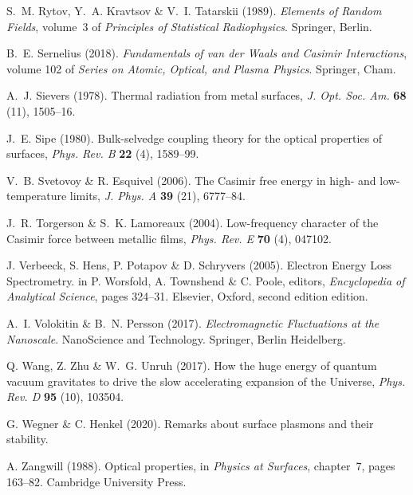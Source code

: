 \documentclass[11pt, oneside]{article}   	%
\begin{document}
\begin{thebibliography}{58}
S.~M. Rytov, Y.~A. Kravtsov \& V.~I. Tatarskii (1989).
\newblock \emph{Elements of Random Fields}, volume~3 of \emph{Principles of
  Statistical Radiophysics}.
\newblock Springer, Berlin.

B.~E. Sernelius (2018).
\newblock \emph{Fundamentals of van der Waals and Casimir Interactions}, volume
  102 of \emph{Series on Atomic, Optical, and Plasma Physics}.
\newblock Springer, Cham.

A.~J. Sievers (1978).
\newblock Thermal radiation from metal surfaces, \emph{J. Opt. Soc. Am.} {\bf
  68} (11), 1505--16.

J.~E. Sipe (1980).
\newblock Bulk-selvedge coupling theory for the optical properties of surfaces,
  \emph{Phys. Rev. B} {\bf 22} (4), 1589--99.

V.~B. Svetovoy \& R. Esquivel (2006).
\newblock The Casimir free energy in high- and low-temperature limits, \emph{J.
  Phys. A} {\bf 39} (21), 6777--84.

J.~R. Torgerson \& S.~K. Lamoreaux (2004).
\newblock Low-frequency character of the Casimir force between metallic films,
  \emph{Phys. Rev. E} {\bf 70} (4), 047102.

J. Verbeeck, S. Hens, P. Potapov \& D. Schryvers (2005).
\newblock Electron Energy Loss Spectrometry.
\newblock in P. Worsfold, A. Townshend \& C. Poole, editors, \emph{Encyclopedia
  of Analytical Science}, pages 324--31. Elsevier, Oxford, second edition
  edition.

A.~I. Volokitin \& B.~N. Persson (2017).
\newblock \emph{Electromagnetic Fluctuations at the Nanoscale}.
\newblock NanoScience and Technology. Springer, Berlin Heidelberg.

Q. Wang, Z. Zhu \& W.~G. Unruh (2017).
\newblock How the huge energy of quantum vacuum gravitates to drive the slow
  accelerating expansion of the Universe, \emph{Phys. Rev. D} {\bf 95} (10),
  103504.

G. Wegner \& C. Henkel (2020).
\newblock Remarks about surface plasmons and their stability.

A. Zangwill (1988).
\newblock Optical properties, in \emph{Physics at Surfaces}, chapter~7, pages
  163--82.
\newblock Cambridge University Press.

\end{thebibliography}



\end{document}
